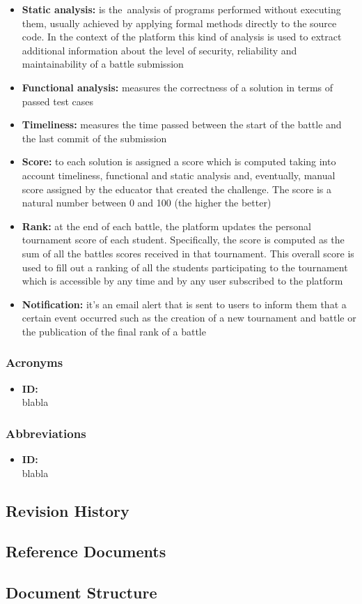 \begin{itemize}
    \item {\textbf{Static analysis:} is the analysis of programs performed without executing them, usually achieved by applying formal methods directly to the source code. In the context of the platform this kind of analysis is used to extract additional information about the level of security, reliability and maintainability of a battle submission}
    \item {\textbf{Functional analysis:} measures the correctness of a solution in terms of passed test cases}
    \item {\textbf{Timeliness:} measures the time passed between the start of the battle and the last commit of the submission}
    \item {\textbf{Score:} to each solution is assigned a score which is computed taking into account timeliness, functional and static analysis and, eventually, manual score assigned by the educator that created the challenge. The score is a natural number between 0 and 100 (the higher the better)}
    \item {\textbf{Rank:} at the end of each battle, the platform updates the personal tournament score of each student. Specifically, the score is computed as the sum of all the battles scores received in that tournament. This overall score is used to fill out a ranking of all the students participating to the tournament which is accessible by any time and by any user subscribed to the platform}
    \item {\textbf{Notification:} it's an  email alert that is sent to users to inform them that a certain event occurred such as the creation of a new tournament and battle or the publication of the final rank of a battle}

\end{itemize}
\subsubsection{Acronyms}
\begin{itemize}
    \item {\textbf{ID:}\\blabla}
\end{itemize}
\subsubsection{Abbreviations}
\begin{itemize}
    \item {\textbf{ID:}\\blabla}
\end{itemize}
\subsection{Revision History}

\subsection{Reference Documents}

\subsection{Document Structure}